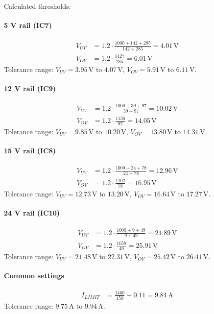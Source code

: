 \documentclass[11pt,a4paper]{article}
\begin{document}
Calculated thresholds:

\paragraph{5 V rail (IC7)}
\begin{align*}
V_{UV} &= 1.2 \cdot \frac{1000 + 142 + 285}{142 + 285} = 4.01\,\mathrm{V} \\
V_{OV} &= 1.2 \cdot \frac{1427}{285} = 6.01\,\mathrm{V}
\end{align*}
Tolerance range: $V_{UV} = 3.95\,\mathrm{V}$ to $4.07\,\mathrm{V}$, $V_{OV} = 5.91\,\mathrm{V}$ to $6.11\,\mathrm{V}$.

\paragraph{12 V rail (IC9)}
\begin{align*}
V_{UV} &= 1.2 \cdot \frac{1000 + 39 + 97}{39 + 97} = 10.02\,\mathrm{V} \\
V_{OV} &= 1.2 \cdot \frac{1136}{97} = 14.05\,\mathrm{V}
\end{align*}
Tolerance range: $V_{UV} = 9.85\,\mathrm{V}$ to $10.20\,\mathrm{V}$, $V_{OV} = 13.80\,\mathrm{V}$ to $14.31\,\mathrm{V}$.

\paragraph{15 V rail (IC8)}
\begin{align*}
V_{UV} &= 1.2 \cdot \frac{1000 + 24 + 78}{24 + 78} = 12.96\,\mathrm{V} \\
V_{OV} &= 1.2 \cdot \frac{1102}{78} = 16.95\,\mathrm{V}
\end{align*}
Tolerance range: $V_{UV} = 12.73\,\mathrm{V}$ to $13.20\,\mathrm{V}$, $V_{OV} = 16.64\,\mathrm{V}$ to $17.27\,\mathrm{V}$.

\paragraph{24 V rail (IC10)}
\begin{align*}
V_{UV} &= 1.2 \cdot \frac{1000 + 9 + 49}{9 + 49} = 21.89\,\mathrm{V} \\
V_{OV} &= 1.2 \cdot \frac{1058}{49} = 25.91\,\mathrm{V}
\end{align*}
Tolerance range: $V_{UV} = 21.48\,\mathrm{V}$ to $22.31\,\mathrm{V}$, $V_{OV} = 25.42\,\mathrm{V}$ to $26.41\,\mathrm{V}$.

\paragraph{Common settings}
\begin{align*}
I_{LIMIT} &= \frac{1460}{150} + 0.11 = 9.84\,\mathrm{A}
\end{align*}
Tolerance range: $9.75\,\mathrm{A}$ to $9.94\,\mathrm{A}$.
\end{document}

